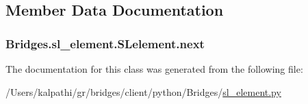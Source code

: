 \subsection{Member Data Documentation}
\hypertarget{class_bridges_1_1sl__element_1_1_s_lelement_a96a8af8acbfe6f35cfdd1fd8ab16281d}{}
\subsubsection[{next}]{\setlength{\rightskip}{0pt plus 5cm}Bridges.\+sl\+\_\+element.\+S\+Lelement.\+next}\label{class_bridges_1_1sl__element_1_1_s_lelement_a96a8af8acbfe6f35cfdd1fd8ab16281d}


The documentation for this class was generated from the following file\+:\begin{DoxyCompactItemize}
\item 
/\+Users/kalpathi/gr/bridges/client/python/\+Bridges/\hyperlink{sl__element_8py}{sl\+\_\+element.\+py}\end{DoxyCompactItemize}
